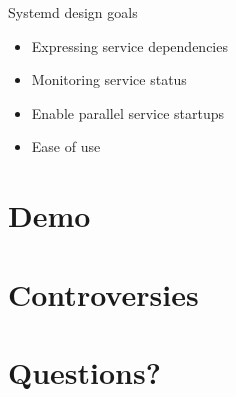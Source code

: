 \documentclass[14pt]{beamer}
\begin{document}
\begin{frame}{Systemd design goals}
  \begin{itemize}
  \item Expressing service dependencies
  \item Monitoring service status
  \item Enable parallel service startups
  \item Ease of use
  \end{itemize}
\end{frame}

\section{Demo}

\section{Controversies}

\section{Questions?}
\end{document}

